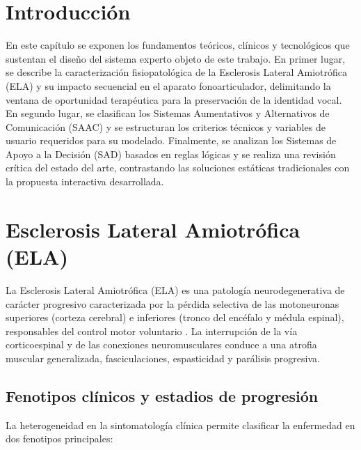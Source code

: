 
\section{Introducción}
En este capítulo se exponen los fundamentos teóricos, clínicos y tecnológicos que sustentan el diseño del sistema experto objeto de este trabajo. En primer lugar, se describe la caracterización fisiopatológica de la Esclerosis Lateral Amiotrófica (ELA) y su impacto secuencial en el aparato fonoarticulador, delimitando la ventana de oportunidad terapéutica para la preservación de la identidad vocal. En segundo lugar, se clasifican los Sistemas Aumentativos y Alternativos de Comunicación (SAAC) y se estructuran los criterios técnicos y variables de usuario requeridos para su modelado. Finalmente, se analizan los Sistemas de Apoyo a la Decisión (SAD) basados en reglas lógicas y se realiza una revisión crítica del estado del arte, contrastando las soluciones estáticas tradicionales con la propuesta interactiva desarrollada.

\section{Esclerosis Lateral Amiotrófica (ELA)}
La Esclerosis Lateral Amiotrófica (ELA) es una patología neurodegenerativa de carácter progresivo caracterizada por la pérdida selectiva de las motoneuronas superiores (corteza cerebral) e inferiores (tronco del encéfalo y médula espinal), responsables del control motor voluntario \cite{hardiman2017amyotrophic}. La interrupción de la vía corticoespinal y de las conexiones neuromusculares conduce a una atrofia muscular generalizada, fasciculaciones, espasticidad y parálisis progresiva. 

\subsection{Fenotipos clínicos y estadios de progresión}
La heterogeneidad en la sintomatología clínica permite clasificar la enfermedad en dos fenotipos principales:


